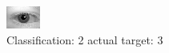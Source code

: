 \begin{figure}[h!]
\begin{center}
\includegraphics[width=0.60\columnwidth]{figures/ID576_class_2_target_3.png}
\end{center}
\caption{ Classification: 2 actual target: 3}
\label{fig:ID576_class_2_target_3}
\end{figure}
